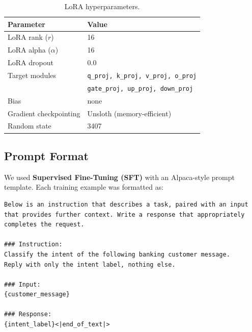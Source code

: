 \documentclass[12pt,a4paper]{article}
\begin{document}
\begin{table}[H]
    \centering
    \caption{LoRA hyperparameters.}
    \label{tab:lora}
    \begin{tabular}{ll}
        \toprule
        \textbf{Parameter}     & \textbf{Value}                                        \\
        \midrule
        LoRA rank ($r$)        & 16                                                    \\
        LoRA alpha ($\alpha$)  & 16                                                    \\
        LoRA dropout           & 0.0                                                   \\
        Target modules         & \texttt{q\_proj, k\_proj, v\_proj, o\_proj}            \\
                               & \texttt{gate\_proj, up\_proj, down\_proj}              \\
        Bias                   & none                                                  \\
        Gradient checkpointing & Unsloth (memory-efficient)                            \\
        Random state           & 3407                                                  \\
        \bottomrule
    \end{tabular}
\end{table}

\subsection{Prompt Format}

We used \textbf{Supervised Fine-Tuning (SFT)} with an Alpaca-style prompt
template. Each training example was formatted as:

\begin{lstlisting}[language={},caption={Prompt template used both for training and inference (the trailing label is omitted at inference time).},label={lst:prompt}]
Below is an instruction that describes a task, paired with an input
that provides further context. Write a response that appropriately
completes the request.

### Instruction:
Classify the intent of the following banking customer message.
Reply with only the intent label, nothing else.

### Input:
{customer_message}

### Response:
{intent_label}<|end_of_text|>
\end{lstlisting}
\end{document}
